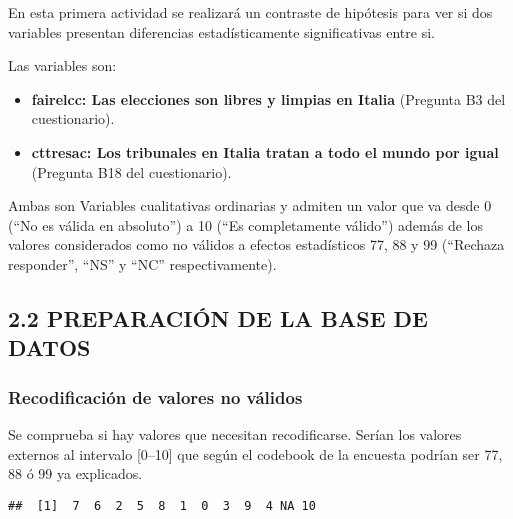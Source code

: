 \documentclass[
  12 pt,
  a4paper,
]{article}
\newenvironment{Shaded}{\begin{snugshade}}{\end{snugshade}}
\newcommand{\FunctionTok}[1]{\textcolor[rgb]{0.13,0.29,0.53}{\textbf{#1}}}
\newcommand{\NormalTok}[1]{#1}
\newcommand{\SpecialCharTok}[1]{\textcolor[rgb]{0.81,0.36,0.00}{\textbf{#1}}}
\providecommand{\tightlist}{%
  \setlength{\itemsep}{0pt}\setlength{\parskip}{0pt}}
\begin{document}
En esta primera actividad se realizará un contraste de hipótesis para
ver si dos variables presentan diferencias estadísticamente
significativas entre si.

Las variables son:

\begin{itemize}
\tightlist
\item
  \textbf{fairelcc: Las elecciones son libres y limpias en Italia}
  (Pregunta B3 del cuestionario).
\item
  \textbf{cttresac: Los tribunales en Italia tratan a todo el mundo por
  igual} (Pregunta B18 del cuestionario).
\end{itemize}

Ambas son Variables cualitativas ordinarias y admiten un valor que va
desde 0 (``No es válida en absoluto'') a 10 (``Es completamente
válido'') además de los valores considerados como no válidos a efectos
estadísticos 77, 88 y 99 (``Rechaza responder'', ``NS'' y ``NC''
respectivamente).

\subsection{2.2 PREPARACIÓN DE LA BASE DE
DATOS}\label{preparaciuxf3n-de-la-base-de-datos}

\subsubsection{Recodificación de valores no
válidos}\label{recodificaciuxf3n-de-valores-no-vuxe1lidos}

Se comprueba si hay valores que necesitan recodificarse. Serían los
valores externos al intervalo {[}0--10{]} que según el codebook de la
encuesta podrían ser 77, 88 ó 99 ya explicados.

\begin{Shaded}
\end{Shaded}

\begin{verbatim}
##  [1]  7  6  2  5  8  1  0  3  9  4 NA 10
\end{verbatim}

\begin{Shaded}
\end{Shaded}
\end{document}
